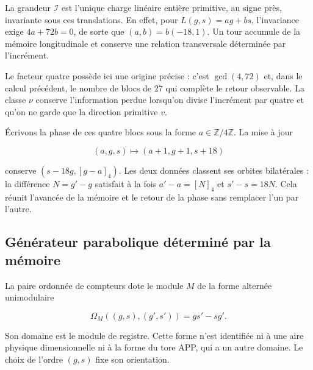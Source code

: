 La grandeur \(\mathcal I\) est l’unique charge linéaire entière primitive, au signe près, invariante sous ces translations. En effet, pour \(L(g,s)=ag+bs\), l’invariance exige \(4a+72b=0\), de sorte que \((a,b)=b(-18,1)\). Un tour accumule de la mémoire longitudinale et conserve une relation transversale déterminée par l’incrément.

Le facteur quatre possède ici une origine précise : c’est \(\gcd(4,72)\) et, dans le calcul précédent, le nombre de blocs de 27 qui complète le retour observable. La classe \(\nu\) conserve l’information perdue lorsqu’on divise l’incrément par quatre et qu’on ne garde que la direction primitive \(v\).

\begin{corollary}

Écrivons la phase de ces quatre blocs sous la forme \(a\in\mathbb Z/4\mathbb Z\). La mise à jour


\[
(a,g,s)\longmapsto(a+1,g+1,s+18)
\]

conserve \((s-18g,[g-a]_4)\). Les deux données classent ses orbites bilatérales : la différence \(N=g'-g\) satisfait à la fois \(a'-a=[N]_4\) et \(s'-s=18N\). Cela réunit l’avancée de la mémoire et le retour de la phase sans remplacer l’un par l’autre.

\end{corollary}

\subsection{Générateur parabolique déterminé par la mémoire}

La paire ordonnée de compteurs dote le module \(M\) de la forme alternée unimodulaire

\[
\Omega_M((g,s),(g',s'))=gs'-sg'.
\]

Son domaine est le module de registre. Cette forme n’est identifiée ni à une aire physique dimensionnelle ni à la forme du tore APP, qui a un autre domaine. Le choix de l’ordre \((g,s)\) fixe son orientation.

